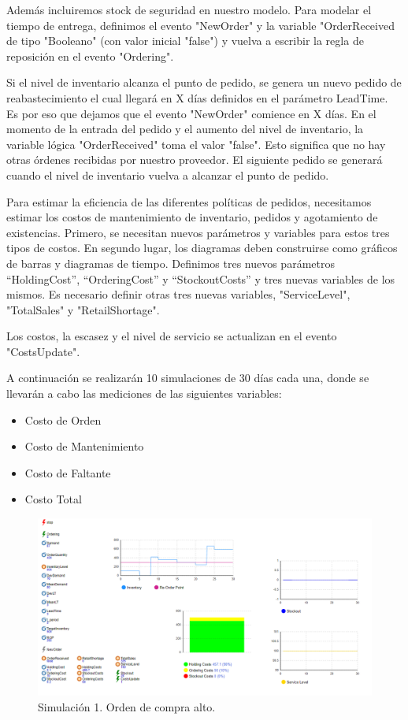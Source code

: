 Además incluiremos stock de seguridad en nuestro modelo.
Para modelar el tiempo de entrega, definimos el evento "NewOrder" y la variable "OrderReceived de tipo "Booleano" (con valor inicial "false") y vuelva a escribir la regla de reposición en el evento "Ordering".

Si el nivel de inventario alcanza el punto de pedido, se genera un nuevo pedido de reabastecimiento el cual llegará en X días definidos en el parámetro LeadTime.
Es por eso que dejamos que el evento "NewOrder" comience en X días.
En el momento de la entrada del pedido y el aumento del nivel de inventario, la variable lógica "OrderReceived" toma el valor "false". Esto significa que no hay otras órdenes
recibidas por nuestro proveedor.
El siguiente pedido se generará cuando el nivel de inventario vuelva a alcanzar el punto de pedido.

Para estimar la eficiencia de las diferentes políticas de pedidos, necesitamos estimar los costos de mantenimiento de inventario, pedidos y agotamiento de existencias.
Primero, se necesitan nuevos parámetros y variables para estos tres tipos de costos. En segundo lugar, los diagramas deben construirse como gráficos de barras y diagramas de tiempo.
Definimos tres nuevos parámetros “HoldingCost”, “OrderingCost” y “StockoutCosts” y tres nuevas variables de los mismos. Es necesario definir otras tres nuevas variables, "ServiceLevel", "TotalSales" y "RetailShortage".

Los costos, la escasez y el nivel de servicio se actualizan en el evento "CostsUpdate".

A continuación se realizarán 10 simulaciones de 30 días cada una, donde se llevarán a cabo las mediciones de las siguientes variables:
\begin{itemize}
    \item Costo de Orden
    \item Costo de Mantenimiento
    \item Costo de Faltante
    \item Costo Total
\end{itemize}

\begin{figure}[H]
    \includegraphics[width=\linewidth]{images/img1invent}
    \caption{Simulación 1. Orden de compra alto.}
\end{figure}

